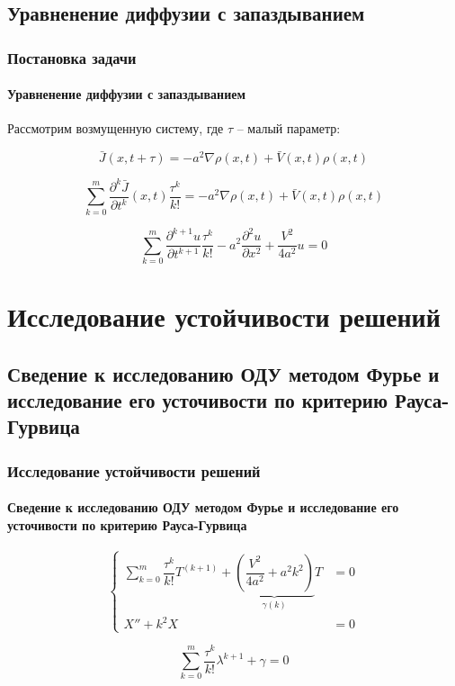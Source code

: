 \documentclass{beamer}
\numberwithin{equation}{section}
\begin{document}
    \subsection{Уравненение диффузии с запаздыванием}
    \begin{frame}
        \frametitle{Постановка задачи}
        \framesubtitle{Уравненение диффузии с запаздыванием}

        Рассмотрим возмущенную систему, где $\tau$ \--- малый параметр:

        \begin{equation}
            \bar{J}(x,t+\tau) = -a^2 \nabla \rho(x,t) + \bar{V}(x,t) \rho(x,t)
        \end{equation}

        \begin{equation}
            \sum\limits_{k=0}^{m} \dfrac{\partial^k \bar{J}}{\partial t^k}(x,t) \dfrac{\tau^k}{k!} = -a^2 \nabla \rho(x,t) + \bar{V}(x,t) \rho(x,t)
        \end{equation}

        \begin{equation}
            \sum\limits_{k=0}^{m} \dfrac{\partial^{k+1} u}{\partial t^{k+1}} \dfrac{\tau^k}{k!} - a^2 \dfrac{\partial^2 u}{\partial x^2} + \dfrac{V^2}{4a^2} u = 0
        \end{equation}

    \end{frame}

    \section{Исследование устойчивости решений}
    \subsection{Сведение к исследованию ОДУ методом Фурье и исследование его усточивости по критерию Рауса-Гурвица}
    \begin{frame}
        \frametitle{Исследование устойчивости решений}
        \framesubtitle{Сведение к исследованию ОДУ методом Фурье и исследование его усточивости по критерию Рауса-Гурвица}

        \begin{equation}
            \left\{
            \begin{aligned}
                \sum\limits_{k=0}^{m} \dfrac{\tau^k}{k!} T^{(k+1)} + \underbrace{ \left( \dfrac{V^2}{4a^2} + a^2 k^2 \right)}_{\gamma(k)} T & = 0\\
                X'' + k^2 X & = 0
            \end{aligned}
            \right.
        \end{equation}

        \begin{equation}
            \sum\limits_{k=0}^{m} \dfrac{\tau^k}{k!} \lambda^{k+1} + {\gamma} = 0
        \end{equation}

    \end{frame}
\end{document}
